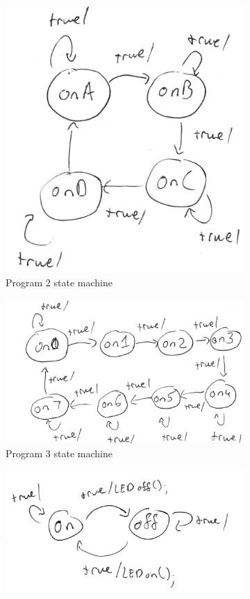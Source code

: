 \documentclass[10pt,titlepage]{article}
\begin{document}
\begin{figure}[p]
\begin{subfigure}[b]{0.48\textwidth}
      \includegraphics[width=\textwidth]{2.png}
      \caption{Program 2 state machine}
      \end{subfigure}
      \begin{subfigure}[b]{0.48\textwidth}
      \includegraphics[width=\textwidth]{3.png}
      \caption{Program 3 state machine}
      \end{subfigure}
      \begin{subfigure}[b]{0.48\textwidth}
      \includegraphics[width=\textwidth]{4.png}

\end{subfigure}
\end{figure}
\end{document}
